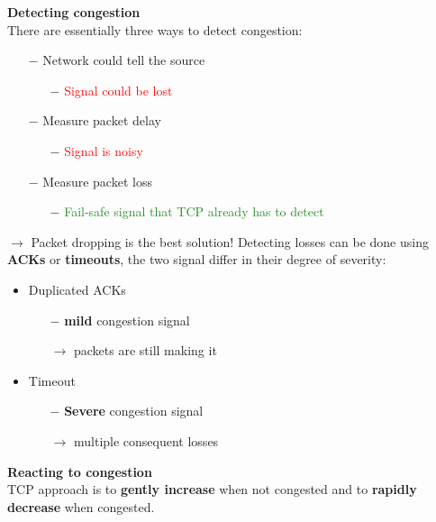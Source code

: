 \documentclass[a4paper, fontsize=8pt, landscape, DIV=1]{scrartcl}
\begin{document}
\begin{multicols*}{4}
		\textbf{Detecting congestion}\\
		There are essentially three ways to detect congestion:
		\begin{itemize}[noitemsep]
			\item[$-$] Network could tell the source
			\begin{itemize}
				\item[$-$] \textcolor{Red}{Signal could be lost}
			\end{itemize}
			\item[$-$] Measure packet delay
			\begin{itemize}
				\item[$-$] \textcolor{Red}{Signal is noisy}
			\end{itemize}
			\item[$-$] Measure packet loss
			\begin{itemize}
				\item[$-$] \textcolor{ForestGreen}{Fail-safe signal that TCP already has to detect}
			\end{itemize}
		\end{itemize}
		$\rightarrow$ Packet dropping is the best solution! Detecting losses can be done using \textbf{ACKs} or \textbf{timeouts}, the two signal differ in their degree of severity:
		\begin{itemize}[noitemsep]
			\item Duplicated ACKs
			\begin{itemize}
				\item[$-$] \textbf{mild} congestion signal
				\item[$\rightarrow$] packets are still making it
			\end{itemize}
			\item Timeout
			\begin{itemize}
				\item[$-$] \textbf{Severe} congestion signal
				\item[$\rightarrow$] multiple consequent losses
			\end{itemize}
		\end{itemize} 
		\par
		
		\textbf{Reacting to congestion}\\
		TCP approach is to \textbf{gently increase} when not congested and to \textbf{rapidly decrease} when congested.\par 
		

\end{multicols*}
\end{document}
